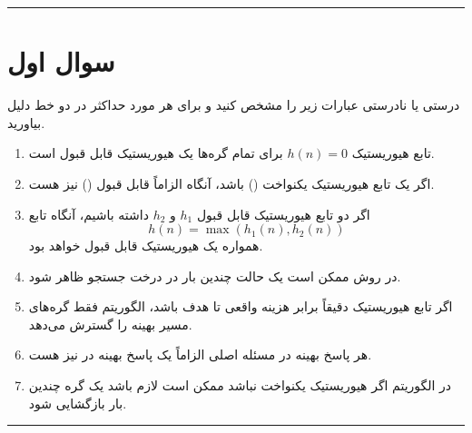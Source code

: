 \documentclass[a4paper,10pt]{article}
\begin{document}
\vspace{8pt}
\textcolor{AccentCyan}{\rule{\linewidth}{0.8pt}}
\section{\textcolor{AccentGold}{سوال اول}}

درستی یا نادرستی عبارات زیر را مشخص کنید و برای هر مورد حداکثر در دو خط دلیل بیاورید.

\begin{enumerate}
	
	\item
	تابع هیوریستیک $h(n)=0$ برای تمام گره‌ها یک هیوریستیک قابل قبول است.
	
	\item
	اگر یک تابع هیوریستیک یکنواخت () باشد، آنگاه الزاماً قابل قبول () نیز هست.
	
	\item
	اگر دو تابع هیوریستیک قابل قبول $h_1$ و $h_2$ داشته باشیم، آنگاه تابع
	\[
	h(n)=\max(h_1(n),h_2(n))
	\]
	همواره یک هیوریستیک قابل قبول خواهد بود.
	
	\item
	در روش  ممکن است یک حالت چندین بار در درخت جستجو ظاهر شود.
	
	\item
	اگر تابع هیوریستیک دقیقاً برابر هزینه واقعی تا هدف باشد، الگوریتم  فقط گره‌های مسیر بهینه را گسترش می‌دهد.
	
	\item
	هر پاسخ بهینه در مسئله اصلی الزاماً یک پاسخ بهینه در  نیز هست.
	
	\item
	در الگوریتم  اگر هیوریستیک یکنواخت نباشد ممکن است لازم باشد یک گره چندین بار بازگشایی شود.
	
\end{enumerate}


\bigskip
\bigskip
\textcolor{AccentCyan}{\rule{\linewidth}{0.4pt}}
\end{document}

